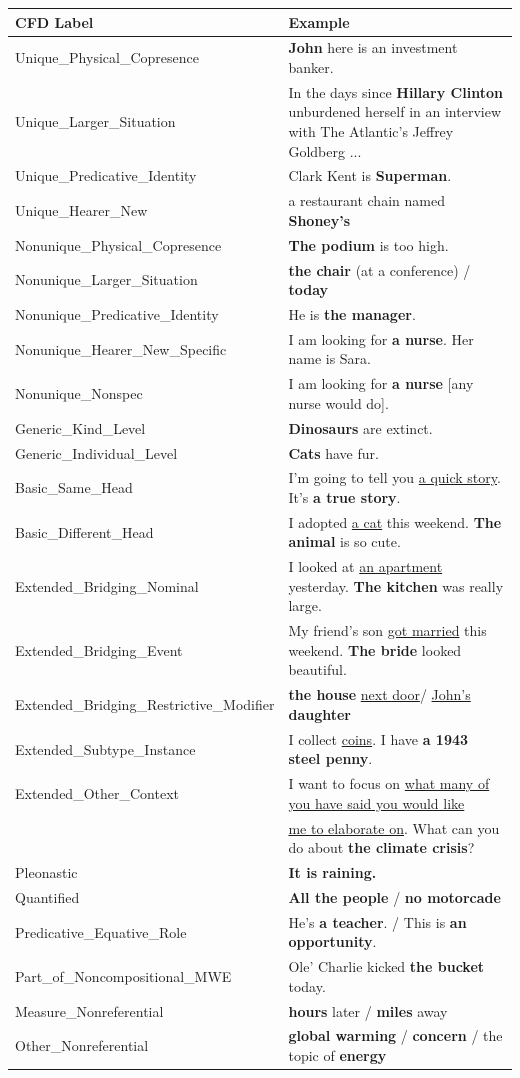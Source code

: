\documentclass[portrait,final]{baposter}
\begin{document}
\begin{poster}
{\vspace{4pt}
\begin {left}\small
\smaller[.5]
\begin{tabular}{p{19em}p{29em}}
{\bf \normalsize{CFD Label}}&{\bf \normalsize{Example}}\\\hline
Unique\_Physical\_Copresence & {\bf John} here is an investment banker.\\Unique\_Larger\_Situation & In the days since {\bf Hillary Clinton} unburdened herself in an interview with The Atlantic's Jeffrey Goldberg ...\\Unique\_Predicative\_Identity & Clark Kent is {\bf Superman}.\\Unique\_Hearer\_New & a restaurant chain named {\bf Shoney's}\\Nonunique\_Physical\_Copresence & {\bf The podium} is too high.\\Nonunique\_Larger\_Situation & {\bf the chair} (at a conference) / {\bf today}\\Nonunique\_Predicative\_Identity & He is {\bf the manager}.\\Nonunique\_Hearer\_New\_Specific & I am looking for {\bf a nurse}. Her name is Sara.\\Nonunique\_Nonspec & I am looking for {\bf a nurse} [any nurse would do].\\Generic\_Kind\_Level & {\bf Dinosaurs} are extinct.\\Generic\_Individual\_Level & {\bf Cats} have fur.\\Basic\_Same\_Head & I'm going to tell you \underline{a quick story}. It's {\bf a true story}.\\Basic\_Different\_Head & I adopted \underline{a cat} this weekend. {\bf The animal} is so cute.\\Extended\_Bridging\_Nominal & I looked at \underline{an apartment} yesterday. {\bf The kitchen} was really large.\\Extended\_Bridging\_Event & My friend's son \underline{got married} this weekend. {\bf The bride} looked beautiful.\\Extended\_Bridging\_Restrictive\_Modifier & {\bf the house} \underline{next door}/ \underline{John's} {\bf daughter}\\Extended\_Subtype\_Instance & I collect \underline{coins}. I have {\bf a 1943 steel penny}.\\Extended\_Other\_Context & I want to focus on \underline{what many of you have said you would like}\\
& \underline{me to elaborate on}. What can you do about {\bf the climate crisis}?\\Pleonastic & {\bf It is raining.}\\Quantified & {\bf All the people} / {\bf no motorcade}\\Predicative\_Equative\_Role & He's {\bf a teacher}. / This is {\bf an opportunity}.\\Part\_of\_Noncompositional\_MWE & Ole' Charlie kicked {\bf the bucket} today.\\Measure\_Nonreferential & {\bf hours} later / {\bf miles} away\\Other\_Nonreferential & {\bf global warming} / {\bf concern} / the topic of {\bf energy} 

\end{tabular}
\end{left}}
\end{poster}
\end{document}
